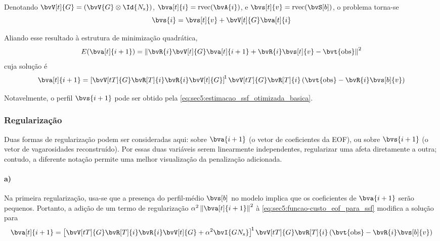 Denotando $\bvV[t]{G} = \pts{\bvV{G} \otimes \Id{N_{\x}}}$, $\bva[t]{i} = \rvec(\bvA{i})$, e $\bvs[t]{v} = \rvec(\bvS[b])$, o problema torna-se
\begin{equation}
	\bvs{i} = \bvs[t]{v} + \bvV[t]{G} \bva[t]{i}
\end{equation}

Aliando esse resultado à estrutura de minimização quadrática,
\begin{equation}
	E(\bva[t]{i+1}) = \norm{\bvR{i} \bvV[t]{G} \bva[t]{i+1} + \bvR{i} \bvs[t]{v} - \bvt{\obs} }^2
	\label{eq:sec5:funcao-custo_eof_para_ssf}
\end{equation}
cuja solução é
\begin{equation}
	\bva[t]{i+1} = \inv*{\bvV[tT]{G} \bvR[T]{i} \bvR{i} \bvV[t]{G}} \bvV[tT]{G} \bvR[T]{i} \pts{\bvt{\obs} - \bvR{i} \bvs[b]{v}}
\end{equation}

Notavelmente, o perfil $\bvs{i+1}$ pode ser obtido pela \cref{eq:sec5:estimacao_ssf_otimizada_basica}.

\subsubsection*{Regularização}

Duas formas de regularização podem ser consideradas aqui: sobre $\bva{i+1}$ (o vetor de coeficientes da EOF), ou sobre $\bvs{i+1}$ (o vetor de vagarosidades reconstruído). Por essas duas variáveis serem linearmente independentes, regularizar uma afeta diretamente a outra; contudo, a diferente notação permite uma melhor visualização da penalização adicionada.

\paragraph{a)} Na primeira regularização, usa-se que a presença do perfil-médio $\bvs[b]$ no modelo implica que os coeficientes de $\bva{i+1}$ serão pequenos. Portanto, a adição de um termo de regularização $\alpha^2 \norm{\bva[t]{i+1}}^2$ à \cref{eq:sec5:funcao-custo_eof_para_ssf} modifica a solução para
\begin{equation}
	\bva[t]{i+1} = \inv*{\bvV[tT]{G} \bvR[T]{i} \bvR{i} \bvV[t]{G} + \alpha^2 \bvI{GN_{\x}}} \bvV[tT]{G} \bvR[T]{i} \pts{\bvt{\obs} - \bvR{i} \bvs[b]{v}}
	\label{eq:sec5:metodo_eof:reg_peq-coef}
\end{equation}

